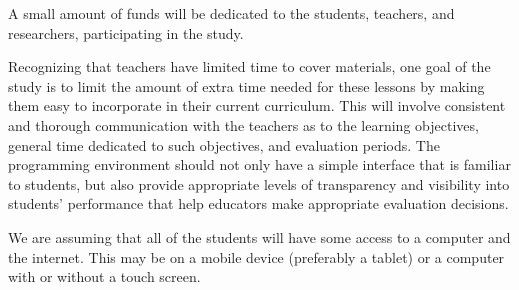 \documentclass[12pt]{article}
\begin{document}
A small amount of funds will be dedicated to the students, teachers, and researchers, participating in the study. 

Recognizing that teachers have limited time to cover materials, one goal of the study is to limit the amount of extra time needed for these lessons by making them easy to incorporate in their current curriculum. This will involve consistent and thorough communication with the teachers as to the learning objectives, general time dedicated to such objectives, and evaluation periods. 
The programming environment should not only have a simple interface that is familiar to students, but also provide appropriate levels of transparency and visibility into students' performance that help educators make appropriate evaluation decisions.

We are assuming that all of the students will have some access to a computer and the internet. This may be on a mobile device (preferably a tablet) or a computer with or without a touch screen.

\end{document}
